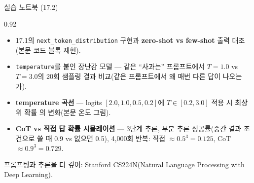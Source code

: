 \begin{frame}{실습 노트북 (17.2)}
\begin{center}\begin{varwidth}{0.92\textwidth}
  \begin{itemize}
    \item 17.1의 \texttt{next\_token\_distribution}
      구현과 \textbf{zero-shot vs few-shot} 출력 대조
      (본문 코드 블록 재현).
    \item \texttt{temperature}를 붙인 장난감 모델 — 같은
      ``사과는'' 프롬프트에서 $T=1.0$ vs $T=3.0$의 20회
      샘플링 결과 비교(같은 프롬프트에서 왜 매번 다른 답이
      나오는가).
    \item \textbf{temperature 곡선} — logits $[2.0, 1.0,
      0.5, 0.2]$에 $T \in [0.2, 3.0]$ 적용 시 최상위 확률
      의 변화(본문 온도 그림).
    \item \textbf{CoT vs 직접 답 확률 시뮬레이션} — 3단계
      추론, 부분 추론 성공률(중간 결과 조건으로 쓸 때 0.9
      vs 없으면 0.5), 4,000회 반복: 직접 $\approx 0.5^3
      = 0.125$, CoT $\approx 0.9^3 = 0.729$.
  \end{itemize}
  {\footnotesize 프롬프팅과 추론을 더 깊이: Stanford
  CS224N(Natural Language Processing with Deep Learning).}
\end{varwidth}\end{center}
\end{frame}
